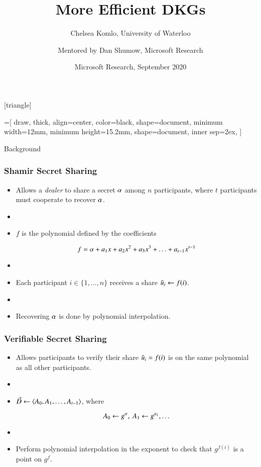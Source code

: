 \documentclass[hyperref={pdfpagelabels=true},table,dvipsnames,14pt,aspectratio=169]{beamer}
\title{More Efficient DKGs}
\author{Chelsea Komlo, University of Waterloo \\
\and
Mentored by Dan Shumow, Microsoft Research}
\date[September 2020]{ \small Microsoft Research, September 2020}
\begin{document}
[triangle]

=[%
draw,
thick,
align=center,
color=black,
shape=document,
minimum width=12mm,
minimum height=15.2mm,
shape=document,
inner sep=2ex,
]

\begin{frame}
        \thispagestyle{empty}
        \maketitle
\end{frame}

\begin{frame}
  \huge
  \centering
  Background
\end{frame}

\begin{frame}
  \frametitle{Shamir Secret Sharing}

  \begin{itemize}
    \item<1-> Allows a \emph{dealer} to share a secret $\alpha$ among $n$ participants, where $t$ participants must cooperate to recover $\alpha$.
    \item[]
    \item<2-> $f$ is the polynomial defined by the coefficients

      \[f = \alpha + a_1 x + a_2 x^2 + a_3 x^3 + \ldots + a_{t-1}x^{t-1}  \]

    \item[]
    \item<3-> Each participant $i \in \{1, \ldots, n \}$ receives a share $\bar{u}_i \gets f(i) $.
    \item[]
    \item<4-> Recovering $\alpha$ is done by polynomial interpolation.
  \end{itemize}
\end{frame}

\begin{frame}
  \frametitle{Verifiable Secret Sharing}

  \begin{itemize}
    \item<1-> Allows participants to verify their share $\bar{u}_i = f(i)$ is on the same polynomial as all other participants.
    \item[]
    \item<2-> $\vec{D} \gets \langle A_0, A_1, \ldots, A_{t-1}  \rangle$, where

      \[ A_0 \gets g^{\alpha},\ A_1 \gets g^{a_1}, \ldots \]
    \item[]
    \item<3-> Perform polynomial interpolation in the exponent to check that $g^{f(i)}$ is a point on $g^f$.
  \end{itemize}
\end{frame}
\end{document}
